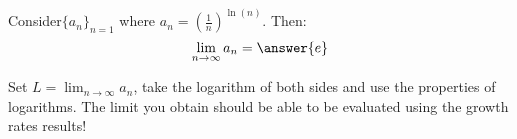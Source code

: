 \documentclass{ximera}
\author{Jim Talamo}
\begin{document}
\begin{exercise}

Consider$\{a_n \}_{n=1}$ where $a_n =\left(\frac{1}{n}\right)^{\ln(n)}$.  Then:
\[
\lim_{n \to \infty} a_n = \answer{e}
\]

\begin{hint}
Set $L = \lim_{n \to \infty} a_n$, take the logarithm of both sides and use the properties of logarithms.  The limit you obtain should be able to be evaluated using the growth rates results!
\end{hint}

\end{exercise}
\end{document}
